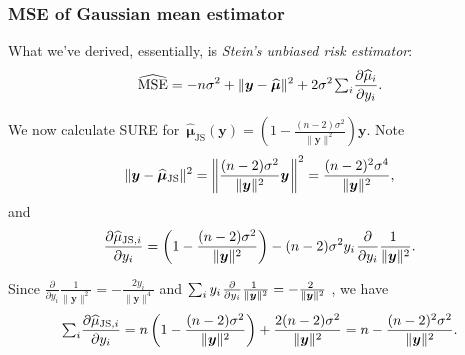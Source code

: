 \documentclass[18pt]{beamer}
\newcommand{\defineTightSpacing}{%
	\setlength{\abovedisplayskip}{.25\baselineskip}%
	\setlength{\belowdisplayskip}{.25\baselineskip}%
}
\renewcommand{\textsc}[1]{{\small \MakeUppercase{#1}}}
\newcommand{\thinnerspace}{\mskip.5\thinmuskip}
\newcommand{\by}{\bm{y}}
\newcommand{\bmu}{\bm{\mu}}
\begin{document}
\begin{frame}
\frametitle{M{\normalsize SE} of Gaussian mean estimator}
What we've derived, essentially, is \textit{Stein's unbiased risk estimator}:
\begin{equation*} \defineTightSpacing%
\widehat{\operatorname{MSE}}
	= - n \sigma^2 +  \| \by - \widehat{\bmu} \|^2 
		+ 2 \sigma^2 \thinnerspace {\textstyle \sum_i} \frac{\partial \widehat{\mu}_i}{\partial y_i}.
\end{equation*}
\vspace*{-.7\baselineskip}

\pause%
We now calculate \textsc{SURE} for $\, \widehat{\bmu}_{\mathrm{JS}}(\by) = \left( 1 - \frac{(n - 2) \sigma^2}{\| \by \|^2} \right) \! \by$.
\pause%
Note
\begin{equation*} \defineTightSpacing%
\| \by - \widehat{\bmu}_{\mathrm{JS}} \|^2 
	= \left\| \frac{(n - 2) \sigma^2}{\| \by \|^2} \by \thinnerspace \right\|^2 
	= \frac{(n - 2)^2 \sigma^4}{\| \by \|^2},
\end{equation*}
\pause%
and
\begin{equation*} \defineTightSpacing%
\frac{\partial \widehat{\mu}_{\mathrm{JS}, i}}{\partial y_i}
	= \left( 1 - \frac{(n - 2) \sigma^2}{\| \by \|^2} \right) - (n - 2) \sigma^2 y_i \thinnerspace \frac{\partial}{\partial y_i} \frac{\!\!1}{\| \by \|^2}.
\end{equation*}

\pause%
\smallskip
Since $\frac{\partial}{\partial y_i} \frac{\!\!1}{\| \by \|^2} = - \frac{\!\!2 y_i}{\| \by \|^4}$ and $\sum_i  y_i \thinnerspace \frac{\partial}{\partial y_i} \frac{\!\!1}{\| \by \|^2} = - \frac{\!\!2}{\| \by \|^2}$ , we have
\begin{equation*} \defineTightSpacing%
{\textstyle \sum_i} \frac{\partial \widehat{\mu}_{\mathrm{JS}, i}}{\partial y_i}
	= n \left( 1 - \frac{(n - 2) \sigma^2}{\| \by \|^2} \right) + \frac{2 (n - 2) \sigma^2}{\| \by \|^2} %
	= n - \frac{(n - 2)^2 \sigma^2}{\| \by \|^2}.
\end{equation*}
\end{frame}
\end{document}
